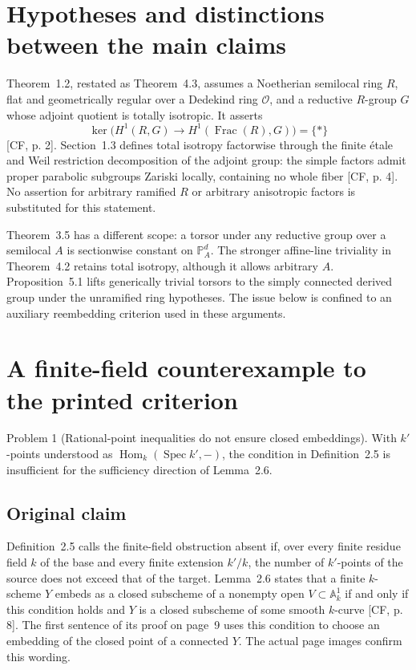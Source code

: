 \documentclass[10pt]{article}
\begin{document}
\section*{Hypotheses and distinctions between the main claims}
Theorem 1.2, restated as Theorem 4.3, assumes a Noetherian semilocal ring \(R\), flat and geometrically regular over a Dedekind ring \(\mathcal O\), and a reductive \(R\)-group \(G\) whose adjoint quotient is totally isotropic. It asserts \[\ker\bigl(H^1(R,G)\longrightarrow H^1(\mathop{\mathrm{Frac}}(R),G)\bigr)=\{*\}\] [CF, p. 2]. Section 1.3 defines total isotropy factorwise through the finite étale and Weil restriction decomposition of the adjoint group: the simple factors admit proper parabolic subgroups Zariski locally, containing no whole fiber [CF, p. 4]. No assertion for arbitrary ramified \(R\) or arbitrary anisotropic factors is substituted for this statement.\par
Theorem 3.5 has a different scope: a torsor under any reductive group over a semilocal \(A\) is sectionwise constant on \(\mathbb P_A^d\). The stronger affine-line triviality in Theorem 4.2 retains total isotropy, although it allows arbitrary \(A\). Proposition 5.1 lifts generically trivial torsors to the simply connected derived group under the unramified ring hypotheses. The issue below is confined to an auxiliary reembedding criterion used in these arguments.\par
\section*{A finite-field counterexample to the printed criterion}
Problem 1 (Rational-point inequalities do not ensure closed embeddings).  With \(k'\)-points understood as \(\operatorname{Hom}_k(\mathop{\mathrm{Spec}}k',-)\), the condition in Definition 2.5 is insufficient for the sufficiency direction of Lemma 2.6.\par
\subsection*{Original claim}
Definition 2.5 calls the finite-field obstruction absent if, over every finite residue field \(k\) of the base and every finite extension \(k'/k\), the number of \(k'\)-points of the source does not exceed that of the target. Lemma 2.6 states that a finite \(k\)-scheme \(Y\) embeds as a closed subscheme of a nonempty open \(V\subset\mathbb A_k^1\) if and only if this condition holds and \(Y\) is a closed subscheme of some smooth \(k\)-curve [CF, p. 8]. The first sentence of its proof on page 9 uses this condition to choose an embedding of the closed point of a connected \(Y\). The actual page images confirm this wording.\par
\end{document}
